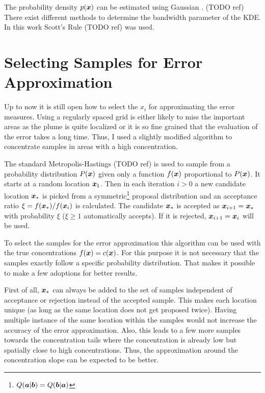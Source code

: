 The probability density $p(\bm{x})$ can be estimated using Gaussian 
. (TODO ref) There exist different 
methods to determine the bandwidth parameter of the KDE\@. In this work Scott's 
Rule (TODO ref) was used.

\section{Selecting Samples for Error Approximation}\label{sec:mh}
Up to now it is still open how to select the $x_i$ for approximating the error 
measures.  Using a regularly spaced grid is either likely to miss the important 
areas as the plume is quite localized or it is so fine grained that the 
evaluation of the error takes a long time. Thus, I used a slightly modified 
 algorithm to concentrate samples in areas with 
a high concentration.

The standard Metropolis-Hastings (TODO ref) is used to sample from a probability 
distribution $P(\bm{x})$ given only a function $f(\bm{x})$ proportional to $P(\bm{x})$. It starts at a random location $\bm{x}_1$.  Then in each iteration $i > 0$ 
a new candidate location $\bm{x}_*$ is picked from a symmetric\footnote{$Q(\bm{a} | \bm{b}) = Q(\bm{b} | \bm{a})$} proposal distribution and an acceptance 
ratio $\xi = f(\bm{x}_*) / f(\bm{x}_i)$ is calculated. The candidate $\bm{x}_*$ is 
accepted as $\bm{x}_{i + 1} = \bm{x}_*$ with probability $\xi$ ($\xi \geq 1$ 
automatically accepts). If it is rejected, $\bm{x}_{i + 1} = \bm{x}_i$ will be 
used.

To select the samples for the error approximation this algorithm can be used 
with the true concentrations $f(\bm{x}) = c(\bm{x})$. For this purpose it is not 
necessary that the samples exactly follow a specific probability distribution.  
That makes it possible to make a few adoptions for better results.

First of all, $\bm{x}_*$ can always be added to the set of samples independent of 
acceptance or rejection instead of the accepted sample.  This makes each 
location unique (as long as the same location does not get proposed twice).  
Having multiple instance of the same location within the samples would not 
increase the accuracy of the error approximation. Also, this leads to a few more 
samples towards the concentration tails where the concentration is already low 
but spatially close to high concentrations.  Thus, the approximation around the 
concentration slope can be expected to be better.

